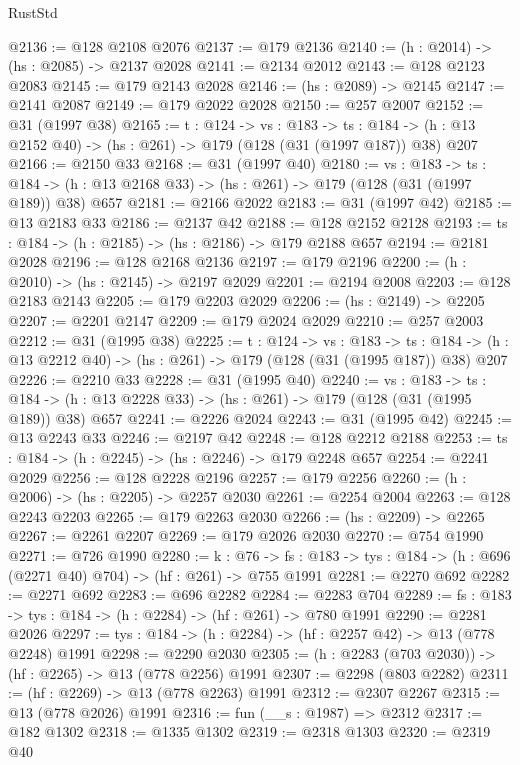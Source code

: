 \begin{lexlean}{RustStd}
\begin{coremodule}
{\begin{coremodule}
{{{{{@2136 := @128 @2108 @2076
@2137 := @179 @2136
@2140 := (h : @2014) -> (hs : @2085) -> @2137 @2028
@2141 := @2134 @2012
@2143 := @128 @2123 @2083
@2145 := @179 @2143 @2028
@2146 := (hs : @2089) -> @2145
@2147 := @2141 @2087
@2149 := @179 @2022 @2028
@2150 := @257 @2007
@2152 := @31 (@1997 @38)
@2165 := {t : @124} ->
  {vs : @183} ->
  {ts : @184} -> (h : @13 @2152 @40) -> (hs : @261) -> @179 (@128 (@31 (@1997 @187)) @38) @207
@2166 := @2150 @33
@2168 := @31 (@1997 @40)
@2180 := {vs : @183} ->
  {ts : @184} -> (h : @13 @2168 @33) -> (hs : @261) -> @179 (@128 (@31 (@1997 @189)) @38) @657
@2181 := @2166 @2022
@2183 := @31 (@1997 @42)
@2185 := @13 @2183 @33
@2186 := @2137 @42
@2188 := @128 @2152 @2128
@2193 := {ts : @184} -> (h : @2185) -> (hs : @2186) -> @179 @2188 @657
@2194 := @2181 @2028
@2196 := @128 @2168 @2136
@2197 := @179 @2196
@2200 := (h : @2010) -> (hs : @2145) -> @2197 @2029
@2201 := @2194 @2008
@2203 := @128 @2183 @2143
@2205 := @179 @2203 @2029
@2206 := (hs : @2149) -> @2205
@2207 := @2201 @2147
@2209 := @179 @2024 @2029
@2210 := @257 @2003
@2212 := @31 (@1995 @38)
@2225 := {t : @124} ->
  {vs : @183} ->
  {ts : @184} -> (h : @13 @2212 @40) -> (hs : @261) -> @179 (@128 (@31 (@1995 @187)) @38) @207
@2226 := @2210 @33
@2228 := @31 (@1995 @40)
@2240 := {vs : @183} ->
  {ts : @184} -> (h : @13 @2228 @33) -> (hs : @261) -> @179 (@128 (@31 (@1995 @189)) @38) @657
@2241 := @2226 @2024
@2243 := @31 (@1995 @42)
@2245 := @13 @2243 @33
@2246 := @2197 @42
@2248 := @128 @2212 @2188
@2253 := {ts : @184} -> (h : @2245) -> (hs : @2246) -> @179 @2248 @657
@2254 := @2241 @2029
@2256 := @128 @2228 @2196
@2257 := @179 @2256
@2260 := (h : @2006) -> (hs : @2205) -> @2257 @2030
@2261 := @2254 @2004
@2263 := @128 @2243 @2203
@2265 := @179 @2263 @2030
@2266 := (hs : @2209) -> @2265
@2267 := @2261 @2207
@2269 := @179 @2026 @2030
@2270 := @754 @1990
@2271 := @726 @1990
@2280 := {k : @76} ->
  {fs : @183} -> {tys : @184} -> (h : @696 (@2271 @40) @704) -> (hf : @261) -> @755 @1991
@2281 := @2270 @692
@2282 := @2271 @692
@2283 := @696 @2282
@2284 := @2283 @704
@2289 := {fs : @183} -> {tys : @184} -> (h : @2284) -> (hf : @261) -> @780 @1991
@2290 := @2281 @2026
@2297 := {tys : @184} -> (h : @2284) -> (hf : @2257 @42) -> @13 (@778 @2248) @1991
@2298 := @2290 @2030
@2305 := (h : @2283 (@703 @2030)) -> (hf : @2265) -> @13 (@778 @2256) @1991
@2307 := @2298 (@803 @2282)
@2311 := (hf : @2269) -> @13 (@778 @2263) @1991
@2312 := @2307 @2267
@2315 := @13 (@778 @2026) @1991
@2316 := fun (__s : @1987) => @2312
@2317 := @182 @1302
@2318 := @1335 @1302
@2319 := @2318 @1303
@2320 := @2319 @40
}}}}}
\end{coremodule}}
\end{coremodule}
\end{lexlean}
